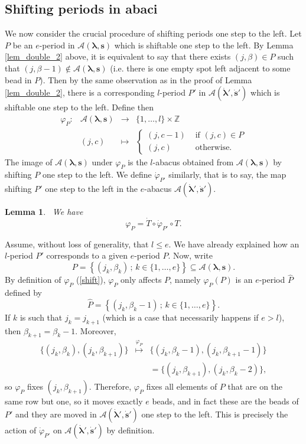 \documentclass[twoside,12pt]{amsart}
\theoremstyle{plain}
\newcommand{\cA}{\mathcal{A}}
\newcommand{\Z}{\mathbb{Z}}
\newcommand{\bs}{\mathbf{s}}
\newcommand{\be}{\beta}
\newcommand{\la}{\lambda}
\newcommand{\bla}{\boldsymbol{\la}}
\newcommand{\dT}{\dot{T}}
\newcommand{\dvarphi}{\dot{\varphi}}
\newcommand{\dbs}{\dot{\bs}}
\newcommand{\dbla}{\dot{\bla}}
\newcommand{\hP}{\widehat{P}}
\newcommand{\lra}{\longrightarrow}
\newtheorem{lem}[num]{Lemma}
\theoremstyle{remark}
\begin{document}
\subsection{Shifting periods in abaci}

We now consider the crucial procedure of shifting periods one step to the left.
Let $P$ be an $e$-period in $\cA(\bla,\bs)$ which is shiftable one step to the left.
By Lemma \ref{lem_double_2} above, it is equivalent to say that there exists
$(j,\be)\in P$ such that $(j,\be-1)\notin\cA(\bla,\bs)$ 
(i.e. there is one empty spot left adjacent to some bead in $P$).
Then by the same observation as in the proof of Lemma \ref{lem_double_2},
there is a corresponding $l$-period $P'$ in $\cA(\dbla',\dbs')$ which is shiftable
one step to the left.
Define then
\begin{equation}\label{shift}
\begin{array}{cccc}
\varphi_{P}: &
\cA(\bla,\bs) & \lra &
\{1,\dots,l\}\times\Z \\
& (j,c) & \longmapsto &
\left\{
\begin{array}{ll}
(j,c-1) & \text{ if } (j,c)\in  P \\
(j,c) & \text{ otherwise.}
\end{array}
\right.
\end{array}
\end{equation}
The image of $\cA(\bla,\bs)$ under $\varphi_{P}$ is the $l$-abacus obtained from 
$\cA(\bla,\bs)$ by shifting $P$ one step to the left.
We define $\dvarphi_{P'}$ similarly, that is to say, the map shifting $P'$ one step to the left
in the $e$-abacus $\cA(\dbla',\dbs')$.



\begin{lem}\label{lem_double_4}\
We have
$$\varphi_{P} = \dT\circ\dvarphi_{P'}\circ T.
$$
\end{lem}


\proof
Assume, without loss of generality, that $l\leq e$.
We have already explained how an $l$-period $P'$ corresponds to a given $e$-period $P$.
Now, write
$$ P = \left\{ (j_k,\be_k) \, ; \, k\in\{1,\dots,e\} \right\} \subseteq \cA(\bla,\bs).$$
By definition of $\varphi_{P}$ (\ref{shift}), 
$\varphi_{P}$ only affects $P$, namely $\varphi_{P}(P)$ is an $e$-period $\hP$
defined by
$$\hP =\left\{ (j_k,\be_k-1) \, ; \, k\in\{1,\dots,e\} \right\}.$$
If $k$ is such that $j_k=j_{k+1}$ (which is a case that necessarily happens if $e>l$),
then $\be_{k+1}=\be_k-1$.
Moreover,
$$ 
\begin{array}{ccl}
\{ (j_k,\be_k) , (j_k, \be_{k+1} ) \} & \overset{\varphi_{P}}{\longmapsto} &
\{ (j_k,\be_k-1) , (j_k, \be_{k+1}-1 )\} \\
& & = \{(j_k,\be_{k+1}) , (j_k, \be_k-2 )\},
\end{array}
$$
so $\varphi_{P}$ fixes $(j_k,\be_{k+1})$.
Therefore, $\varphi_{P}$ fixes all elements of $P$ that are on the same row but one,
so it moves exactly $e$ beads,
and in fact these are the beads of $P'$ and they are moved in $\cA(\dbla',\dbs')$
one step to the left.
This is precisely the action of $\dvarphi_{P'}$ on $\cA(\dbla',\dbs')$ by definition.
\endproof
\end{document}
